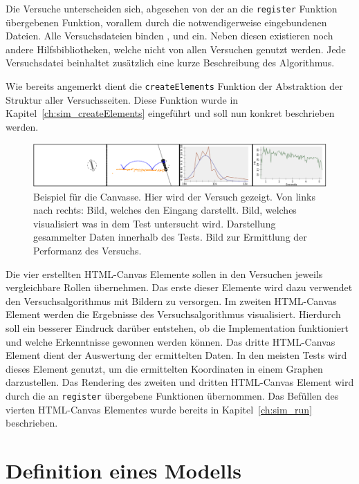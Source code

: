 Die Versuche unterscheiden sich, abgesehen von der an die \lstinline{register} Funktion übergebenen Funktion, vorallem durch die notwendigerweise eingebundenen Dateien.
Alle Versuchsdateien binden ,  und  ein.
Neben diesen existieren noch andere Hilfsbibliotheken, welche nicht von allen Versuchen genutzt werden.
Jede Versuchsdatei beinhaltet zusätzlich eine kurze Beschreibung des Algorithmus.

Wie bereits angemerkt dient die \lstinline{createElements} Funktion der Abstraktion der Struktur aller Versuchsseiten.
Diese Funktion wurde in Kapitel~\ref{ch:sim_createElements} eingeführt und soll nun konkret beschrieben werden.

\begin{figure}
    \includegraphics[width=\textwidth]{gfx/canvasses.png}
    \caption[Bild der Canvasse]{Beispiel für die Canvasse. Hier wird der Versuch  gezeigt. Von links nach rechts: Bild, welches den Eingang darstellt. Bild, welches visualisiert was in dem Test untersucht wird. Darstellung gesammelter Daten innerhalb des Tests. Bild zur Ermittlung der Performanz des Versuchs.}\label{fig:canvasses}
\end{figure}

Die vier erstellten HTML-Canvas Elemente sollen in den Versuchen jeweils vergleichbare Rollen übernehmen.
Das erste dieser Elemente wird dazu verwendet den Versuchsalgorithmus mit Bildern zu versorgen.
Im zweiten HTML-Canvas Element werden die Ergebnisse des Versuchsalgorithmus visualisiert.
Hierdurch soll ein besserer Eindruck darüber entstehen, ob die Implementation funktioniert und welche Erkenntnisse gewonnen werden können.
Das dritte HTML-Canvas Element dient der Auswertung der ermittelten Daten.
In den meisten Tests wird dieses Element genutzt, um die ermittelten Koordinaten in einem Graphen darzustellen.
Das Rendering des zweiten und dritten HTML-Canvas Element wird durch die an \lstinline{register} übergebene Funktionen übernommen.
Das Befüllen des vierten HTML-Canvas Elementes wurde bereits in Kapitel~\ref{ch:sim_run} beschrieben.

\section{Definition eines  Modells}

